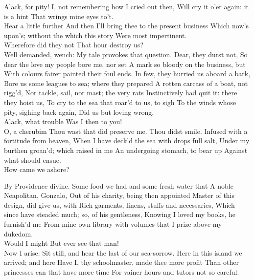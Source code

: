 \documentclass[11pt]{book}
\begin{document}
\2	Alack, for pity!
	I, not remembering how I cried out then,
	Will cry it o'er again: it is a hint
	That wrings mine eyes to't. \\

\1	Hear a little further
	And then I'll bring thee to the present business
	Which now's upon's; without the which this story
	Were most impertinent. \\

\2	Wherefore did they not
	That hour destroy us? \\

\1	Well demanded, wench:
	My tale provokes that question. Dear, they durst not,
	So dear the love my people bore me, nor set
	A mark so bloody on the business, but
	With colours fairer painted their foul ends.
	In few, they hurried us aboard a bark,
	Bore us some leagues to sea; where they prepared
	A rotten carcass of a boat, not rigg'd,
	Nor tackle, sail, nor mast; the very rats
	Instinctively had quit it: there they hoist us,
	To cry to the sea that roar'd to us, to sigh
	To the winds whose pity, sighing back again,
	Did us but loving wrong. \\

\2	Alack, what trouble
	Was I then to you! \\

\1	                  O, a cherubim
	Thou wast that did preserve me. Thou didst smile.
	Infused with a fortitude from heaven,
	When I have deck'd the sea with drops full salt,
	Under my burthen groan'd; which raised in me
	An undergoing stomach, to bear up
	Against what should ensue. \\

\2	How came we ashore?

\1	By Providence divine.
	Some food we had and some fresh water that
	A noble Neapolitan, Gonzalo,
	Out of his charity, being then appointed
	Master of this design, did give us, with
	Rich garments, linens, stuffs and necessaries,
	Which since have steaded much; so, of his gentleness,
	Knowing I loved my books, he furnish'd me
	From mine own library with volumes that
	I prize above my dukedom. \\

\2	Would I might
	But ever see that man! \\
\1	Now I arise:
	Sit still, and hear the last of our sea-sorrow.
	Here in this island we arrived; and here
	Have I, thy schoolmaster, made thee more profit
	Than other princesses can that have more time
	For vainer hours and tutors not so careful.
\end{document}
